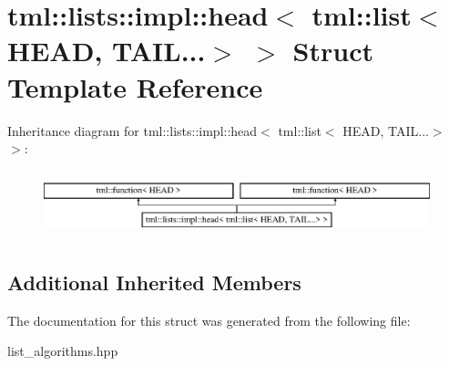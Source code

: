 \hypertarget{structtml_1_1lists_1_1impl_1_1head_3_01tml_1_1list_3_01HEAD_00_01TAIL_8_8_8_4_01_4}{\section{tml\+:\+:lists\+:\+:impl\+:\+:head$<$ tml\+:\+:list$<$ H\+E\+A\+D, T\+A\+I\+L...$>$ $>$ Struct Template Reference}
\label{structtml_1_1lists_1_1impl_1_1head_3_01tml_1_1list_3_01HEAD_00_01TAIL_8_8_8_4_01_4}
}
Inheritance diagram for tml\+:\+:lists\+:\+:impl\+:\+:head$<$ tml\+:\+:list$<$ H\+E\+A\+D, T\+A\+I\+L...$>$ $>$\+:\begin{figure}[H]
\begin{center}
\leavevmode
\includegraphics[height=1.964912cm]{structtml_1_1lists_1_1impl_1_1head_3_01tml_1_1list_3_01HEAD_00_01TAIL_8_8_8_4_01_4}
\end{center}
\end{figure}
\subsection*{Additional Inherited Members}


The documentation for this struct was generated from the following file\+:\begin{DoxyCompactItemize}
\item 
list\+\_\+algorithms.\+hpp\end{DoxyCompactItemize}
